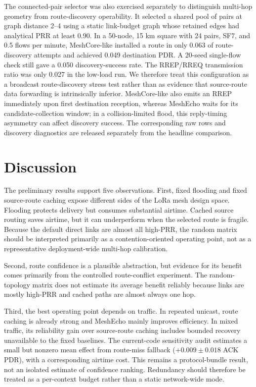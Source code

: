 \documentclass[conference]{IEEEtran}
\begin{document}
The connected-pair selector was also exercised separately to distinguish
multi-hop geometry from route-discovery operability. It selected a shared pool
of pairs at graph distance 2--4 using a static link-budget graph whose retained
edges had analytical PRR at least 0.90. In a 50-node, 15 km square with
24 pairs, SF7, and 0.5 flows per minute, MeshCore-like installed a route in
only 0.063 of route-discovery attempts and achieved 0.049 destination PDR.
A 20-seed single-flow check still gave a 0.050 discovery-success rate. The
RREP/RREQ transmission ratio was only 0.027 in the low-load run. We therefore
treat this configuration as a broadcast route-discovery stress test rather than
as evidence that source-route data forwarding is intrinsically inferior.
MeshCore-like also emits an RREP immediately upon first destination reception,
whereas MeshEcho waits for its candidate-collection window; in a
collision-limited flood, this reply-timing asymmetry can affect discovery
success. The corresponding raw rows and discovery diagnostics are released
separately from the headline comparison.

\section{Discussion}

The preliminary results support five observations. First, fixed flooding and
fixed source-route caching expose different sides of the LoRa mesh design
space. Flooding protects delivery but consumes substantial airtime. Cached
source routing saves airtime, but it can underperform when the selected route is
fragile. Because the default direct links are almost all high-PRR, the random
matrix should be interpreted primarily as a contention-oriented operating point,
not as a representative deployment-wide multi-hop calibration.

Second, route confidence is a plausible abstraction, but evidence for its
benefit comes primarily from the controlled route-conflict experiment. The
random-topology matrix does not estimate its average benefit reliably because
links are mostly high-PRR and cached paths are almost always one hop.

Third, the best operating point depends on traffic. In repeated unicast, route
caching is already strong and MeshEcho mainly improves efficiency. In mixed
traffic, its reliability gain over source-route caching includes bounded
    recovery unavailable to the fixed baselines. The current-code sensitivity
    audit estimates a small but nonzero mean effect from route-miss fallback
    ($+0.009\pm0.018$ ACK PDR), with a corresponding airtime cost. This remains
    a protocol-bundle result, not an isolated estimate of confidence ranking.
    Redundancy should therefore be treated as a per-context budget rather than
    a static network-wide mode.
\end{document}
